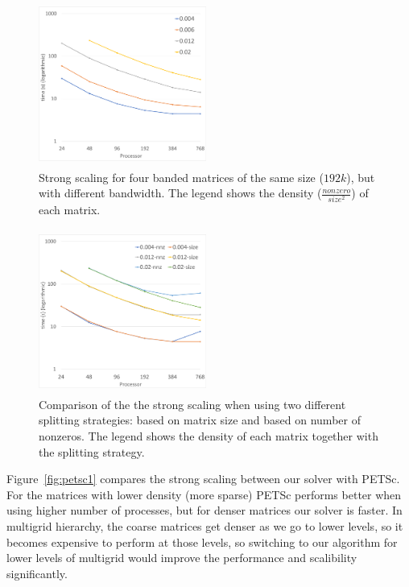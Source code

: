 \begin{figure}[tbh]
    \centering
    \includegraphics[width=5.5cm,height=5.4cm]{./figures/strong_size.pdf}
    \caption{Strong scaling for four banded matrices of the same size ($192k$), but with different bandwidth. The legend shows the density ($\frac{nonzero}{size^2}$) of each matrix.}
    \label{fig:strong1}
    \Description{}
\end{figure}

\begin{figure}[tbh]
    \centering
    \includegraphics[width=5.5cm,height=5.4cm]{./figures/strong_size_vs_nnz.pdf}
    \caption{Comparison of the the strong scaling when using two different splitting strategies: based on matrix size and based on number of nonzeros. The legend shows the density of each matrix together with the splitting strategy.}
    \label{fig:strong2}
    \Description{}
\end{figure}

Figure~\ref{fig:petsc1} compares the strong scaling between our solver with PETSc. For the matrices with lower density (more sparse) PETSc performs better when using higher number of processes, but for denser matrices our solver is faster. In multigrid hierarchy, the coarse matrices get denser as we go to lower levels, so it becomes expensive to perform \mm at those levels, so switching to our algorithm for lower levels of multigrid would improve the performance and scalibility significantly.

